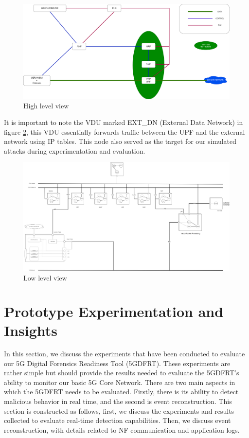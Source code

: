 \documentclass[final,1p,times,authoryear]{elsarticle}
\begin{document}
\begin{figure}[H]
  \centering
  \includegraphics[width=\textwidth, height=\textheight, keepaspectratio]{diagrams/V6_Config_HL.png}
  \caption{High level view}
  \label{fig:hl_config}
\end{figure}
It is important to note the VDU marked EXT\_DN (External Data Network) in figure \ref{fig:ll_config}, this VDU essentially forwards traffic between the UPF and the external network using IP tables. This node also served as the target for our simulated attacks during experimentation and evaluation.
\begin{figure}[H]
  \centering
  \includegraphics[angle=90, width=1.05\textwidth, height=1.05\textheight, keepaspectratio]{diagrams/Final_Config_LL.png}
  \caption{Low level view}
  \label{fig:ll_config}
\end{figure}
\newpage

\section{Prototype Experimentation and Insights}
\label{sec4}
In this section, we discuss the experiments that have been conducted to evaluate our 5G Digital Forensics Readiness Tool (5GDFRT). These experiments are rather simple but should provide the results needed to evaluate the 5GDFRT's ability to monitor our basic 5G Core Network. There are two main aspects in which the 5GDFRT needs to be evaluated. Firstly, there is its ability to detect malicious behavior in real time, and the second is event reconstruction. This section is constructed as follows, first, we discuss the experiments and results collected to evaluate real-time detection capabilities. Then, we discuss event reconstruction, with details related to NF communication and application logs.
\end{document}
